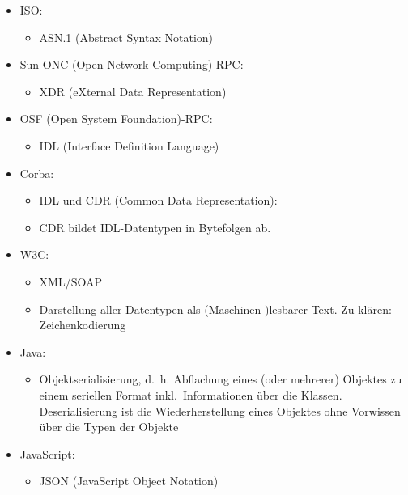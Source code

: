 \begin{itemize}
    \item ISO:
    \begin{itemize}
        \item ASN.1 (Abstract Syntax Notation)
    \end{itemize}
    \item Sun ONC (Open Network Computing)-RPC:
    \begin{itemize}
        \item XDR (eXternal Data Representation)
    \end{itemize}
    \item OSF (Open System Foundation)-RPC:
    \begin{itemize}
        \item IDL (Interface Definition Language)
    \end{itemize}
    \item Corba:
    \begin{itemize}
        \item IDL und CDR (Common Data Representation):
        \item CDR bildet IDL-Datentypen in Bytefolgen ab.
    \end{itemize}
    \item W3C:
    \begin{itemize}
        \item XML/SOAP
        \item Darstellung aller Datentypen als (Maschinen-)lesbarer Text.
        Zu klären: Zeichenkodierung
    \end{itemize}
    \item Java:
    \begin{itemize}
        \item Objektserialisierung, d.\ h. Abflachung eines (oder mehrerer) Objektes zu einem seriellen Format inkl.\ Informationen über die Klassen.
        Deserialisierung ist die Wiederherstellung eines Objektes ohne Vorwissen über die Typen der Objekte
    \end{itemize}
    \item JavaScript:
    \begin{itemize}
        \item JSON (JavaScript Object Notation)
    \end{itemize}
\end{itemize}

